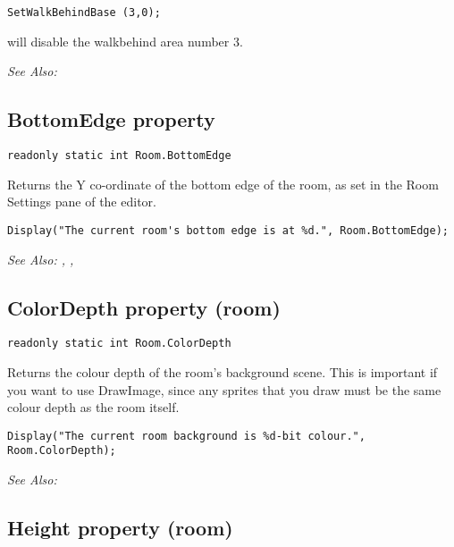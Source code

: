 \begin{verbatim}
SetWalkBehindBase (3,0);
\end{verbatim}
will disable the walkbehind area number 3.

\it{See Also:} 


\subsection{BottomEdge property}\label{Room.BottomEdge}%

\begin{verbatim}
readonly static int Room.BottomEdge
\end{verbatim}
Returns the Y co-ordinate of the bottom edge of the room, as set in the Room Settings
pane of the editor.

\begin{verbatim}
Display("The current room's bottom edge is at %d.", Room.BottomEdge);
\end{verbatim}

\it{See Also:} , ,


\subsection{ColorDepth property (room)}\label{Room.ColorDepth}%

\begin{verbatim}
readonly static int Room.ColorDepth
\end{verbatim}
Returns the colour depth of the room's background scene. This is important if
you want to use DrawImage, since any sprites that you draw must be the same
colour depth as the room itself.

\begin{verbatim}
Display("The current room background is %d-bit colour.", Room.ColorDepth);
\end{verbatim}

\it{See Also:} 


\subsection{Height property (room)}\label{Room.Height}%

